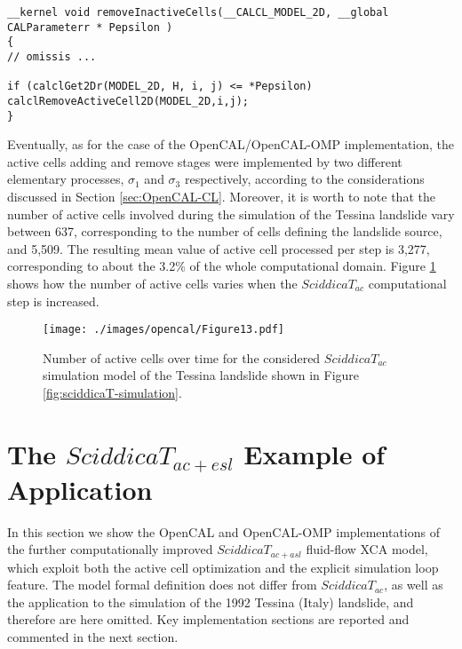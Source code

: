 \begin{lstlisting}[basicstyle=\footnotesize, numbers=none]
__kernel void removeInactiveCells(__CALCL_MODEL_2D, __global CALParameterr * Pepsilon )
{
// omissis ...

if (calclGet2Dr(MODEL_2D, H, i, j) <= *Pepsilon)
calclRemoveActiveCell2D(MODEL_2D,i,j);
}
\end{lstlisting}

Eventually, as for the case of the OpenCAL/OpenCAL-OMP
implementation, the active cells adding and remove stages were
implemented by two different elementary processes, $\sigma_1$ and
$\sigma_3$ respectively, according to the considerations discussed
in Section \ref{sec:OpenCAL-CL}. Moreover, it is worth to note
that the number of active cells involved during the simulation of
the Tessina landslide vary between 637, corresponding to the
number of cells defining the landslide source, and 5,509. The
resulting mean value of active cell processed per step is 3,277,
corresponding to about the 3.2\% of the whole computational
domain. Figure \ref{gr:active_cells_count} shows how the number of
active cells varies when the $SciddicaT_{ac}$ computational step
is increased.

\begin{figure}
	\begin{center}
		\texttt{[image: ./images/opencal/Figure13.pdf]}
		\caption{Number of active cells over time for the considered $SciddicaT_{ac}$ simulation model of the Tessina landslide shown in Figure \ref{fig:sciddicaT-simulation}.}
		\label{gr:active_cells_count}
	\end{center}
\end{figure}

\section{The $SciddicaT_{ac+esl}$ Example of Application}
\label{sec:SciddicaT-ac+esl}

In this section we show the OpenCAL and OpenCAL-OMP implementations
of the further computationally improved $SciddicaT_{ac+asl}$
fluid-flow XCA model, which exploit both the active cell
optimization and the explicit simulation loop feature. The model
formal definition does not differ from $SciddicaT_{ac}$, as well as
the application to the simulation of the 1992 Tessina (Italy)
landslide, and therefore are here omitted. Key implementation
sections are reported and commented in the next section.

